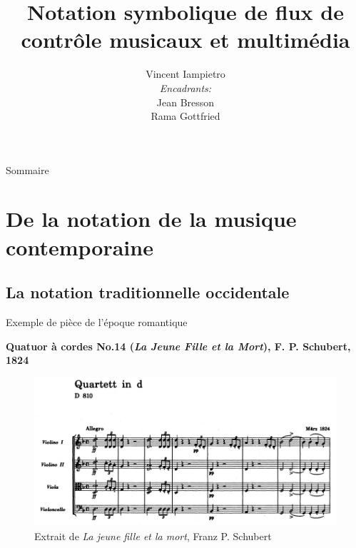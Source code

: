 \documentclass[pdf]{beamer}
\title[]{Notation symbolique de flux de contrôle musicaux et multimédia}
\institute[]{Faculté des sciences - Université de Montpellier}
\author[]{Vincent Iampietro\\[2ex] {\small \textit{Encadrants:} \\ Jean Bresson \\ Rama Gottfried}}
\begin{document}
\begin{frame}[plain]
	\titlepage
\end{frame}

\begin{frame}[plain]{Sommaire}
	\tableofcontents
\end{frame}

\section[De la notation]{De la notation de la musique contemporaine}

\subsection[Notation traditionnelle]{La notation traditionnelle occidentale}
\begin{frame}{Exemple de pièce de l'époque romantique}
\begin{center}
\textbf{Quatuor à cordes No.14 (\textit{La Jeune Fille et la Mort}), F. P. Schubert, 1824}\\
\end{center}
\end{frame}

\begin{frame}
	\begin{figure}
		\centering
		\includegraphics[keepaspectratio=true, width=\textwidth]{./medias/deathAndTheMaiden_extract1.jpg}
		\caption{Extrait de \textit{La jeune fille et la mort}, Franz P. Schubert}
	\end{figure}
\end{frame}
\end{document}
